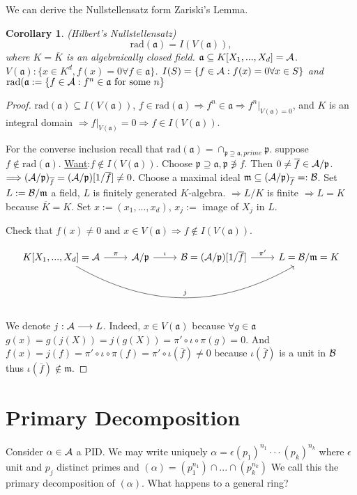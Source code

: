 \documentclass[11pt]{article}
\newtheorem{cor}[thm]{Corollary}
\newcommand{\sca}{{\mathfrak a}}
\newcommand{\scm}{{\mathfrak m}}
\newcommand{\scp}{{\mathfrak p}}
\newcommand{\cala}{{\cal A}}
\newcommand{\calb}{{\cal B}}
\newcommand{\Lrta}{\Longrightarrow}
\newcommand{\lrta}{\longrightarrow}
\begin{document}
We can derive the  Nullstellensatz form Zariski's Lemma. 
\begin{cor}\label{cor:Nullstellensatz}(Hilbert's Nullstellensatz)
$$
\text{rad}(\sca)=I(V(\sca)),
$$ 
where $K=\overline{K}$ is an algebraically closed field. $\sca\subseteq K[X_1,...,X_d]=\cala$. $V(\sca):\{x\in K^d, f(x)=0\forall f\in \sca\}$. $I(S)=\{f\in \cala:f(x)=0\forall x\in S\}$ and $\text{rad}(\sca:=\{f\in \cala:f^n\in \sca \text{ for some } n\}$
\end{cor}
\begin{proof}
$\text{rad}(\sca)\subseteq I(V(\sca))$, $f\in \text{rad}(\sca)\Lrta f^n\in \sca\Lrta f^n|_{V(\sca)=0}$, and $K$ is an integral domain $\Lrta f|_{V(\sca)}=0$$\Lrta f\in I(V(\sca))$. 

For the converse inclusion recall that $\text{rad}(\sca)=\cap_{\scp\supseteq \sca, prime}\scp$. suppose $f\notin  \text{rad}(\sca) $. \underline{Want}:$f\notin I(V(\sca))$. Choose $\scp\supseteq \sca,\scp \not \ni f$. Then $0\neq \overline{f}\in \cala/\scp$. $\Lrta (\cala/\scp)_{\overline{f}}=(\cala/\scp)[1/\overline{f}]\neq 0$. Choose a maximal ideal $\scm\subseteq (\cala/\scp)_{\overline{f}}=:\calb$. Set $L:=\calb/\scm$ a field, $L$ is finitely generated $K$-algebra. $\Lrta L/K $ is finite $\Lrta L=K$ because $\overline{K}=K$. Set $x:=(x_1,...,x_d)$, $x_j:=$ image of $X_j$ in $L$.

 Check that $f(x)\neq 0\text{ and } x\in V(\sca)\Lrta f\notin I(V(\sca))$. 

 \[
\begin{tikzcd}
K[X_1,...,X_d]=\cala\ar[r,"\pi"]\ar[rrr,bend right,"j"]&\cala/\scp\ar[r,"\iota"]&\calb=(\cala/\scp)[1/\overline{f}]\ar[r,"\pi'"] & L=\calb/\scm=K  
\end{tikzcd}
\]

We denote $j:\cala\lrta L$.
Indeed, $x\in V(\sca)$ because $\forall g\in \sca$ $g(x)=g(j(X))=j(g(X))=\pi'\circ\iota\circ\pi(g)=0$. And $f(x)=j(f)=\pi'\circ\iota\circ\pi(f)=\pi'\circ\iota (\overline{f})\neq 0$ because $\iota(\overline{f})$ is a unit in $\calb$ thus $\iota(\overline{f})\notin\scm$.
\end{proof}

\section{Primary Decomposition}
Consider $\alpha\in \cala$ a PID. We may write uniquely $\alpha=\epsilon (p_1)^{n_1}\cdot \cdot\cdot (p_k)^{n_k}$ where $\epsilon$ unit and $p_j$ distinct  primes and $(\alpha)=(p_1^{n_1})\cap...\cap(p_k^{n_k})$ We call this the primary decomposition of $(\alpha)$. What happens to a general ring?
\end{document}

